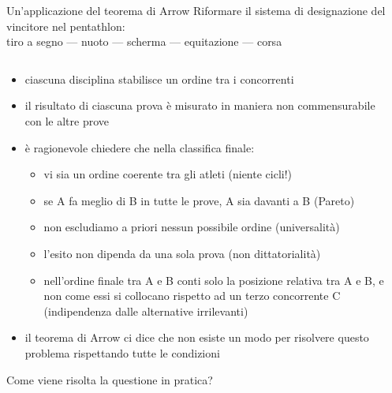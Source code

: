 \documentclass[11pt]{beamer}
\begin{document}
\begin{frame}{Un'applicazione del teorema di Arrow}
Riformare il sistema di designazione del vincitore nel \alert{pentathlon}: \\[0pt]
tiro a segno --- nuoto --- scherma --- equitazione --- corsa
\begin{columns}
\begin{column}{.8\columnwidth}
\begin{itemize}
\item ciascuna disciplina stabilisce un ordine tra i concorrenti
\item il risultato di ciascuna prova è misurato in maniera non commensurabile con
le altre prove
\item è ragionevole chiedere che nella classifica finale:
\begin{itemize}
\item vi sia un ordine coerente tra gli atleti (niente cicli!)
\item se A fa meglio di B in tutte le prove, A sia davanti a B (Pareto)
\item non escludiamo a priori nessun possibile ordine (universalità)
\item l'esito non dipenda da una sola prova (non dittatorialità)
\item nell'ordine finale tra A e B conti solo la posizione relativa tra A
e B, e non come essi si collocano rispetto ad un terzo concorrente C
(indipendenza dalle alternative irrilevanti)
\end{itemize}
\item il teorema di Arrow ci dice che non esiste un modo per risolvere questo
problema rispettando tutte le condizioni
\end{itemize}
Come viene risolta la questione in pratica?
\end{column}
\begin{column}{.2\columnwidth}
\begin{center}

\end{center}
\end{column}
\end{columns}
\end{frame}
\end{document}
